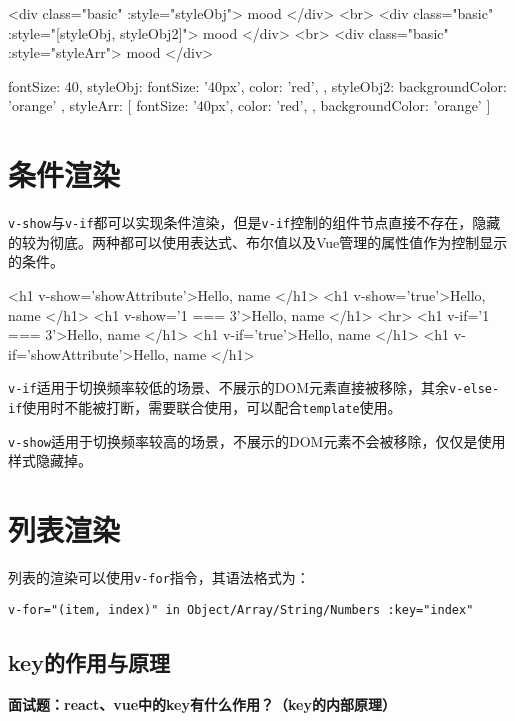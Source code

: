 \begin{html}
<div class="basic" :style="styleObj">{{ mood }}</div>
<br>
<div class="basic" :style="[styleObj, styleObj2]">{{ mood }}</div>
<br>
<div class="basic" :style="styleArr">{{ mood }}</div>
\end{html}

\begin{js}
fontSize: 40,
    styleObj: {
        fontSize: '40px',
        color: 'red',
    },
    styleObj2: {
        backgroundColor: 'orange'
    },
    styleArr: [
    {
        fontSize: '40px',
        color: 'red',
    },
    {
        backgroundColor: 'orange'
    }
]
\end{js}

\section{条件渲染}
\verb|v-show|与\verb|v-if|都可以实现条件渲染，但是\verb|v-if|控制的组件节点直接不存在，隐藏的较为彻底。两种都可以使用表达式、布尔值以及Vue管理的属性值作为控制显示的条件。

\begin{html}
<h1 v-show='showAttribute'>Hello, {{ name }}</h1>
<h1 v-show='true'>Hello, {{ name }}</h1>
<h1 v-show='1 === 3'>Hello, {{ name }}</h1>
<hr>
<h1 v-if='1 === 3'>Hello, {{ name }}</h1>
<h1 v-if='true'>Hello, {{ name }}</h1>
<h1 v-if='showAttribute'>Hello, {{ name }}</h1>
\end{html}

\verb|v-if|适用于切换频率较低的场景、不展示的DOM元素直接被移除，其余\verb|v-else-if|使用时不能被打断，需要联合使用，可以配合\verb|template|使用。

\verb|v-show|适用于切换频率较高的场景，不展示的DOM元素不会被移除，仅仅是使用样式隐藏掉。

\section{列表渲染}
列表的渲染可以使用\verb|v-for|指令，其语法格式为：

\verb|v-for="(item, index)" in Object/Array/String/Numbers :key="index"|

\subsection{key的作用与原理}
\textbf{面试题：react、vue中的key有什么作用？（key的内部原理）}

